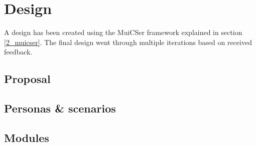 \section{Design} \label{design}


A design has been created using the MuiCSer framework explained in section \ref{2_muicser}. The final design went through multiple iterations based on received feedback.

    \subsection{Proposal}

    \subsection{Personas \& scenarios}

    \subsection{Modules}

    